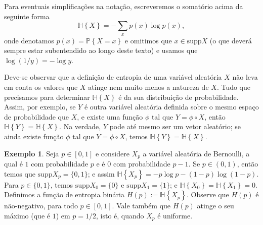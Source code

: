 \documentclass{amsart}
\theoremstyle{theorem}
\theoremstyle{definition}
\newtheorem{ex}{Exemplo}[section]
\theoremstyle{remark}
\numberwithin{equation}{section}
\newcommand{\PP}[1]{\mathbb{P}\left\{ #1 \right\}}
\newcommand{\HH}[1]{\mathbb{H}\left\{ #1 \right\}}
\newcommand{\supp}[1]{\mathrm{supp} #1}
\begin{document}
Para eventuais simplifica\c{c}\~{o}es na nota\c{c}\~{a}o, escreveremos o somat\'{o}rio acima da seguinte forma
\begin{equation}\label{eq2}
  \HH{X} = -\sum_{x} p(x) \log{{p(x)}},
\end{equation}
onde denotamos $p(x) = \PP{X = x}$ e omitimos que $x \in \supp{X}$ (o que dever\'{a} sempre estar subentendido ao longo deste texto) e usamos que $\log(1/y) = - \log{y}$.

Deve-se observar que a defini\c{c}\~{a}o de entropia de uma vari\'{a}vel aleat\'{o}ria $X$ n\~{a}o leva em conta os valores que $X$ atinge nem muito menos a natureza de $X$. Tudo que precisamos para determinar $\HH{X}$ \'{e} da sua distribui\c{c}\~{a}o de probabilidade. Assim, por exemplo, se $Y$ \'{e} outra vari\'{a}vel aleat\'{o}ria definida sobre o mesmo espa\c{c}o de probabilidade que $X$, e existe uma fun\c{c}\~{a}o $\phi$ tal que $Y = \phi \circ X$, ent\~{a}o $\HH{Y} = \HH{X}$. Na verdade, $Y$ pode at\'{e} mesmo ser um vetor aleat\'{o}rio; se ainda existe fun\c{c}\~{a}o $\phi$ tal que $Y = \phi \circ X$, temos $\HH{Y} = \HH{X}$.

\begin{ex}\label{ex1}
  Seja $p\in[0,1]$ e considere $X_p$ a vari\'{a}vel aleat\'{o}ria de Bernoulli, a qual \'{e} $1$ com probabilidade $p$ e \'{e} $0$ com probabilidade $p-1$. Se $p\in (0,1)$, ent\~{a}o temos que $\supp{X_p} = \{0,1\}$; e assim $\HH{X_p} = -p\log{p} - (1-p)\log(1-p)$. Para $p\in\{0,1\}$, temos $\supp{X_0} = \{0\}$ e $\supp{X_1} = \{1\}$; e $\HH{X_0} = \HH{X_1} = 0$. Definimos a fun\c{c}\~{a}o de entropia bin\'{a}ria $H(p) := \HH{X_p}$. Observe que $H(p)$ \'{e} n\~{a}o-negativo, para todo $p\in[0,1]$. Vale tamb\'{e}m que $H(p)$ atinge o seu m\'{a}ximo (que \'{e} $1$) em $p = 1/2$, isto \'{e}, quando $X_p$ \'{e} uniforme.
\end{ex}
\end{document}
